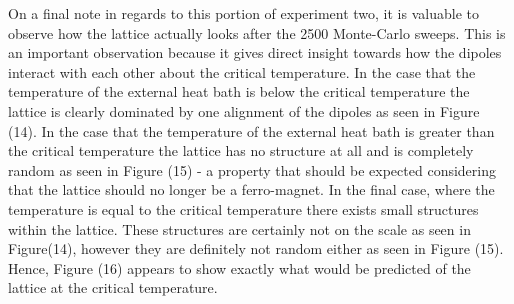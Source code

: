 \documentclass[twocolumn]{article}
\begin{document}
On a final note in regards to this portion of experiment two, it is valuable to observe how the lattice actually looks after the 2500 Monte-Carlo sweeps. This is an important observation because it gives direct insight towards how the dipoles interact with each other about the critical temperature. In the case that the temperature of the external heat bath is below the critical temperature the lattice is clearly dominated by one alignment of the dipoles as seen in Figure (14). In the case that the temperature of the external heat bath is greater than the critical temperature the lattice has no structure at all and is completely random as seen in Figure (15) - a property that should be expected considering that the lattice should no longer be a ferro-magnet. In the final case, where the temperature is equal to the critical temperature there exists small structures within the lattice. These structures are certainly not on the scale as seen in Figure(14), however they are definitely not random either as seen in Figure (15). Hence, Figure (16) appears to show exactly what would be predicted of the lattice at the critical temperature. \\
\end{document}
